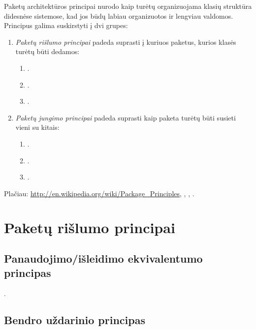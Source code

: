 
Paketų architektūros principai nurodo kaip turėtų organizuojama klasių
struktūra didesnėse sistemose, kad jos būdų labiau organizuotos
ir lengviau valdomos. Principus galima suskirstyti į dvi grupes:
\begin{enumerate}
  \item \emph{Paketų rišlumo principai} padeda suprasti į kuriuos
    paketus, kurios klasės turėtų būti dedamos:
    \begin{enumerate}
      \item {}.
      \item {}.
      \item {}.
    \end{enumerate}
  \item \emph{Paketų jungimo principai} padeda suprasti kaip paketa
    turėtų būti susieti vieni su kitais:
    \begin{enumerate}
      \item {}.
      \item {}.
      \item {}.
    \end{enumerate}
\end{enumerate}

Plačiau: \url{http://en.wikipedia.org/wiki/Package\_Principles},
\cite{martin2000design}, \cite{martin1995designing},
\cite{martin2003agile}.

\section{Paketų rišlumo principai}

\subsection{Panaudojimo/išleidimo ekvivalentumo principas}

\label{subsection:package:rep}

.

\subsection{Bendro uždarinio principas}

\label{subsection:package:ccp}

